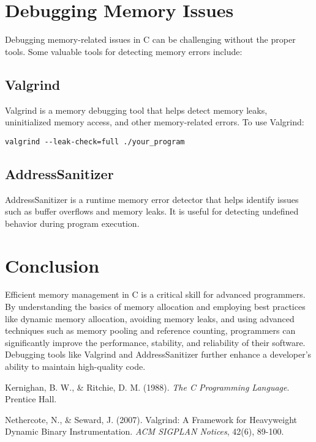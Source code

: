 \documentclass[a4paper,12pt]{article}
\begin{document}
\section{Debugging Memory Issues}
Debugging memory-related issues in C can be challenging without the proper tools. Some valuable tools for detecting memory errors include:

\subsection*{Valgrind}
Valgrind is a memory debugging tool that helps detect memory leaks, uninitialized memory access, and other memory-related errors. To use Valgrind:
\begin{verbatim}
valgrind --leak-check=full ./your_program
\end{verbatim}

\subsection*{AddressSanitizer}
AddressSanitizer is a runtime memory error detector that helps identify issues such as buffer overflows and memory leaks. It is useful for detecting undefined behavior during program execution.

\section{Conclusion}
Efficient memory management in C is a critical skill for advanced programmers. By understanding the basics of memory allocation and employing best practices like dynamic memory allocation, avoiding memory leaks, and using advanced techniques such as memory pooling and reference counting, programmers can significantly improve the performance, stability, and reliability of their software. Debugging tools like Valgrind and AddressSanitizer further enhance a developer’s ability to maintain high-quality code.

\begin{thebibliography}{9}
Kernighan, B. W., \& Ritchie, D. M. (1988). \textit{The C Programming Language}. Prentice Hall.

Nethercote, N., \& Seward, J. (2007). Valgrind: A Framework for Heavyweight Dynamic Binary Instrumentation. \textit{ACM SIGPLAN Notices}, 42(6), 89-100.
\end{thebibliography}
\end{document}

